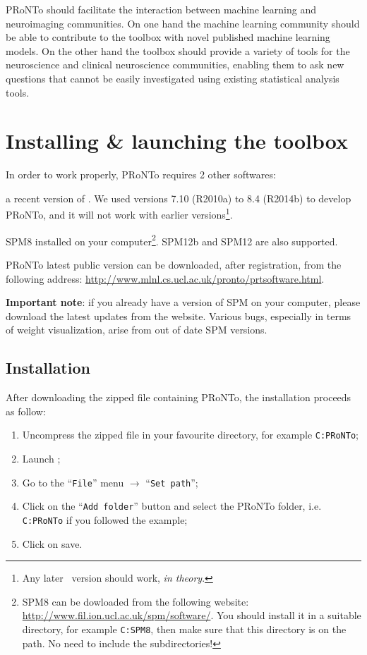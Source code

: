 PRoNTo should facilitate the interaction between machine learning and neuroimaging communities. On one hand the machine learning community should be able to contribute to the toolbox with novel published machine learning models. On the other hand the toolbox should provide a variety of tools for the neuroscience and clinical neuroscience communities, enabling them to ask new questions that cannot be easily investigated using existing statistical analysis tools. 


\section{Installing \& launching the toolbox}
\label{sec:Installation}

In order to work properly, PRoNTo requires 2 other softwares:
\bi
\item a recent version of \matlab. We used versions 7.10 (R2010a) to 8.4 (R2014b) to develop PRoNTo, and it will not work with earlier versions\footnote{Any later \matlab~version should work, {\it in theory}.}. 
\item SPM8\cite{SPM8} installed on your computer\footnote{SPM8 can be dowloaded from the following website: \url{http://www.fil.ion.ucl.ac.uk/spm/software/}. You should install it in a suitable directory, for example {\tt C:\bslash SPM8\bslash }, then make sure that this directory is on the \matlab path. No need to include the subdirectories!}. SPM12b and SPM12 are also supported.
\ei

PRoNTo latest public version can be downloaded, after registration, from the following address: \url{http://www.mlnl.cs.ucl.ac.uk/pronto/prtsoftware.html}.

\textbf{Important note}: if you already have a version of SPM on your computer, please download the latest updates from the website. Various bugs, especially in terms of weight visualization, arise from out of date SPM versions.

\subsection{Installation}

After downloading the zipped file containing PRoNTo, the installation proceeds as follow:
\begin{enumerate}\addtolength{\itemsep}{-1\baselineskip}
\item	Uncompress the zipped file in your favourite directory, for example {\tt C:\bslash PRoNTo\bslash };\\
\item	Launch \matlab ;\\
\item	Go to the ``{\tt File}'' menu $\rightarrow$ ``{\tt Set path}'';\\
\item	Click on the ``{\tt Add folder}'' button and select the PRoNTo folder, i.e. {\tt C:\bslash PRoNTo\bslash } if you followed the example;\\
\item	Click on save.
\end{enumerate}


